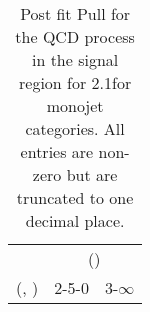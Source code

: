 \begin{table}[h!]
\tiny
\centering
\caption{Post fit Pull for the QCD process in the signal region for 2.1\ifb for monojet categories. All entries are non-zero but are truncated to one decimal place.\label{tab:pullseppost_sig_qcd_mono}}
\begin{tabular}
{ccc}
	\hline\hline
	& \multicolumn{2}{c}{\scalht (\gev)} \\ 
	 (\njet,  \nb) & 2-5-0 & 3-$\infty$ \\ [0.8ex] 
\hline
	\hline
	\hline
\end{tabular}
\end{table}
